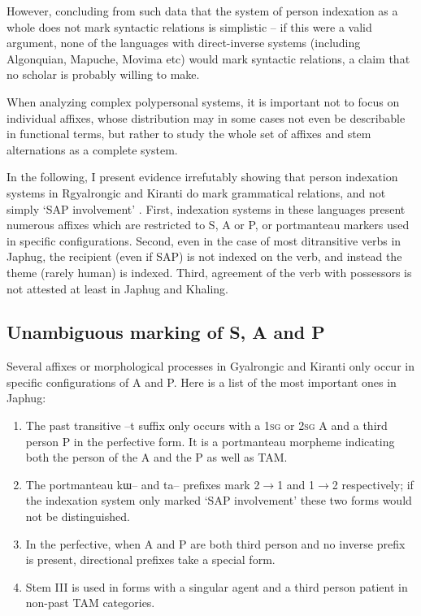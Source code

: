 \documentclass[oldfontcommands,oneside,a4paper,11pt]{article}
\newcommand{\ipa}[1]{{\phon \mbox{#1}}} %
\begin{document}
However, concluding from such data that the system of person indexation as a whole does not mark syntactic relations is simplistic -- if this were a valid argument, none of the languages with direct-inverse systems (including Algonquian, Mapuche, Movima etc) would mark syntactic relations, a claim that no scholar is probably willing to make. 

When analyzing complex polypersonal systems, it is important not to focus on individual affixes, whose distribution may in some cases not even be describable in functional terms, but rather to study the whole set of affixes and stem alternations as a complete system. 

In the following, I present evidence irrefutably showing that person indexation systems in Rgyalrongic and Kiranti do mark grammatical relations, and not simply `SAP involvement' . First, indexation systems in these languages present numerous affixes which are restricted to S, A or P, or portmanteau markers used in specific configurations. Second, even in the case of most ditransitive verbs in Japhug, the recipient (even if SAP) is not indexed on the verb, and instead the theme (rarely human) is indexed. Third, agreement of the verb with possessors is not attested at least in Japhug and Khaling.

\subsection{Unambiguous marking of S, A and P}
Several affixes or morphological processes in Gyalrongic and Kiranti only occur  in specific configurations of A and P. Here is a list of the most important ones in Japhug:

\begin{enumerate}
\item The past transitive \ipa{--t} suffix only occurs with a \textsc{1sg} or \textsc{2sg} A and a third person P in the perfective form. It is a portmanteau morpheme indicating both the person of the A and the P as well as TAM.
\item The portmanteau \ipa{kɯ--} and \ipa{ta--} prefixes mark 2$\rightarrow$1 and 1$\rightarrow$2 respectively; if the indexation system only marked `SAP involvement' these two forms would not be distinguished.
\item In the perfective, when A and P are both third person and no inverse prefix is present, directional prefixes take a special form.
\item Stem III is used in forms with a singular agent and a third person patient in non-past TAM categories.
\end{enumerate}
\end{document}
